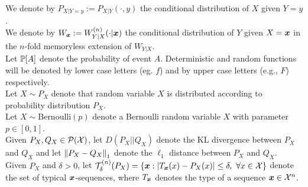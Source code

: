\\
We denote by $P_{X|Y=y} := P_{X|Y}(\cdot ,y)$ the conditional distribution of $X$ given $Y=y$.
\\
We denote by $W_{\boldsymbol{x}} := W_{Y|X}^{(n)}(\cdot|\boldsymbol{x})$ the conditional distribution of $Y$ given $X=\boldsymbol{x}$ in the $n$-fold memoryless extension of $W_{Y|X}$.
\\
Let $\mathbb{P}[A]$ denote the probability of event $A$. Deterministic and random functions will be denoted by lower case letters (eg. $f$) and by upper case letters (e.g., $F$) respectively. 
\\
Let $X \sim P_X$ denote that random variable $X$ is distributed according to probability distribution $P_X$.
\\
Let $X\sim \text{Bernoulli}(p)$ denote a Bernoulli random variable $X$ with parameter $p\in[0,1]$. 
\\
Given $P_X,Q_X \in \mathcal{P}(\mathcal{X})$, let $D(P_X||Q_X)$ denote the KL divergence between $P_X$ and $Q_{X}$ and let $\left\| P_{X}-Q_X \right\|_1$ denote the $\ell_1$ distance between $P_X$ and $Q_{X}$.
%
\\
Given $P_X$ and $\delta>0$, let $\mathcal{T}^{(n)}_{\delta}(P_X)=\{\boldsymbol{x}: \left|T_{\boldsymbol{x}}(x)-P_{X}(x)\right|\leq \delta, \ \forall x \in \mathcal{X}\}$ denote the set of typical $\boldsymbol{x}$-sequences, where $T_{\boldsymbol{x}}$ denotes the type of a sequence $\boldsymbol{x}\in\mathcal{X}^n$.  
%